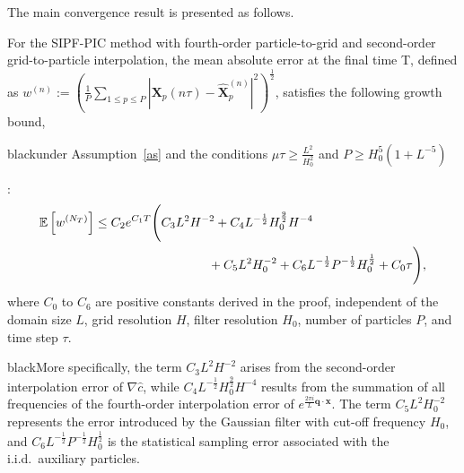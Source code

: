 \documentclass[review,onefignum,onetabnum]{siamart250211}
\begin{document}
The main convergence result is presented as follows.
\begin{theorem}
\label{thm:overall_error}
For the SIPF-PIC method with fourth-order particle-to-grid and second-order grid-to-particle interpolation, the mean absolute error at the final time T, defined as $w^{(n)}:=\left(\frac{1}{P}\sum_{1\leq p \leq P}|\mathbf{X}_p(n \tau)-\widehat{\mathbf{X}}_p^{(n)}|^2\right)^\frac{1}{2}$, satisfies the following growth bound, \begin{color}{black}under  Assumption~\ref{as} and the conditions \(\mu\tau \geq \frac{L^2}{H_0^2}\) and \(P \geq H_0^5(1+L^{-5})\)\end{color}:
\begin{equation}
\label{eq:main_results_thm}
\begin{aligned}
\mathbb{E}\left[w^{\left(N_T\right)}\right] &\leq C_2 e^{C_1T}
\Bigg(
C_3 L^2 H^{-2}
+C_4L^{-\frac{1}{2}}H_0^\frac{9}{2}H^{-4} \\
&\hspace{3.2cm}
+C_5L^2H_0^{-2}
+C_6L^{-\frac{1}{2}}P^{-\frac{1}{2}}H_0^\frac{1}{2}+C_0 \tau
\Bigg),
\end{aligned}
\end{equation}
where \(C_0\) to \(C_6\) are positive constants derived in the proof, independent of the domain size \(L\), grid resolution \(H\), filter resolution \(H_0\), number of particles \(P\), and time step \(\tau\). \begin{color}{black}More specifically, the term $C_3L^2H^{-2}$ arises from the second-order interpolation error of $\nabla\hat{c}$, while $C_4L^{-\frac{1}{2}}H_0^{\frac{9}{2}}H^{-4}$ results from the summation of all frequencies of the fourth-order interpolation error of $e^{\frac{2\pi i}{L}\mathbf{q}\cdot\mathbf{x}}$. The term $C_5L^2H_0^{-2}$ represents the error introduced by the Gaussian filter with cut-off frequency $H_0$, and $C_6L^{-\frac{1}{2}}P^{-\frac{1}{2}}H_0^{\frac{1}{2}}$ is the statistical sampling error associated with the i.i.d.\ auxiliary particles.\end{color}
\end{theorem}
\end{document}
